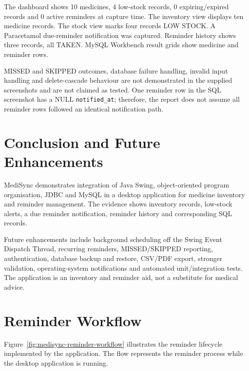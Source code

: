 \documentclass[12pt,a4paper,oneside]{report}
\begin{document}
The dashboard shows 10 medicines, 4 low-stock records, 0 expiring/expired records and 0 active reminders at capture time. The inventory view displays ten medicine records. The stock view marks four records LOW STOCK. A Paracetamol due-reminder notification was captured. Reminder history shows three records, all TAKEN. MySQL Workbench result grids show medicine and reminder rows.

MISSED and SKIPPED outcomes, database failure handling, invalid input handling and delete-cascade behaviour are not demonstrated in the supplied screenshots and are not claimed as tested. One reminder row in the SQL screenshot has a NULL \texttt{notified\_at}; therefore, the report does not assume all reminder rows followed an identical notification path.

\chapter{Conclusion and Future Enhancements}
MediSync demonstrates integration of Java Swing, object-oriented program organisation, JDBC and MySQL in a desktop application for medicine inventory and reminder management. The evidence shows inventory records, low-stock alerts, a due reminder notification, reminder history and corresponding SQL records.

Future enhancements include background scheduling off the Swing Event Dispatch Thread, recurring reminders, MISSED/SKIPPED reporting, authentication, database backup and restore, CSV/PDF export, stronger validation, operating-system notifications and automated unit/integration tests. The application is an inventory and reminder aid, not a substitute for medical advice.

\appendix
\chapter{Reminder Workflow}
Figure~\ref{fig:medisync-reminder-workflow} illustrates the reminder lifecycle implemented by the application. The flow represents the reminder process while the desktop application is running.
\end{document}
